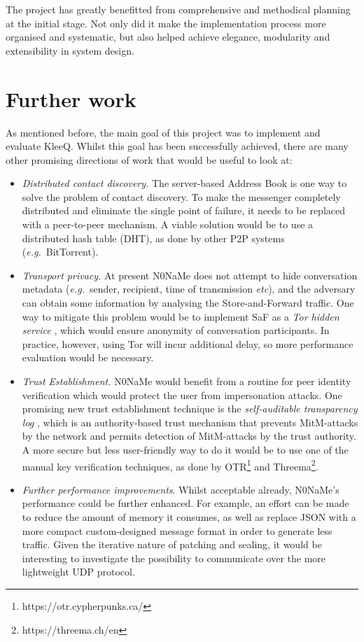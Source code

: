 \documentclass[a4paper, twoside, 12pt]{report}
\newcommand{\funkytt}{\fontfamily{AnonymousPro}\selectfont}
\begin{document}
The project has greatly benefitted from comprehensive and methodical planning at the initial stage. Not only did it make the implementation process more organised and systematic, but also helped achieve elegance, modularity and extensibility in system design. 


\section{Further work}
As mentioned before, the main goal of this project was to implement and evaluate KleeQ. Whilst this goal has been successfully achieved, there are many other promising directions of work that would be useful to look at:
\begin{itemize}
    \item \textit{Distributed contact discovery.} The server-based Address Book is one way to solve the problem of contact discovery. To make the messenger completely distributed and eliminate the single point of failure, it needs to be replaced with a peer-to-peer mechanism. A viable solution would be to use a distributed hash table (DHT), as done by other P2P systems (\textit{e.g.}~BitTorrent).
    \item \textit{Transport privacy.} At present {\funkytt N0NaMe} does not attempt to hide conversation metadata (\textit{e.g.}~sender, recipient, time of transmission \textit{etc}), and the adversary can obtain some information by analysing the Store-and-Forward traffic. One way to mitigate this problem would be to implement SaF as a \emph{Tor hidden service} \cite{murdoch2016security}, which would ensure anonymity of conversation participants. In practice, however, using Tor will incur additional delay, so more performance evaluation would be necessary.
    \item \textit{Trust Establishment.} {\funkytt N0NaMe} would benefit from a routine for peer identity verification which would protect the user from impersonation attacks. One promising new trust establishment technique is the \emph{self-auditable transparency log} \cite{melara2014coniks}, which is an authority-based trust mechanism that prevents MitM-attacks by the network and permits detection of MitM-attacks by the trust authority. A more secure but less user-friendly way to do it would be to use one of the manual key verification techniques, as done by OTR\footnote{https://otr.cypherpunks.ca/} and Threema\footnote{https://threema.ch/en}.
    \item \textit{Further performance improvements}. Whilst acceptable already, {\funkytt N0NaMe}'s performance could be further enhanced. For example, an effort can be made to reduce the amount of memory it consumes, as well as replace JSON with a more compact custom-designed message format in order to generate less traffic. Given the iterative nature of patching and sealing, it would be interesting to investigate the possibility to communicate over the more lightweight UDP protocol.
\end{itemize}
\end{document}

